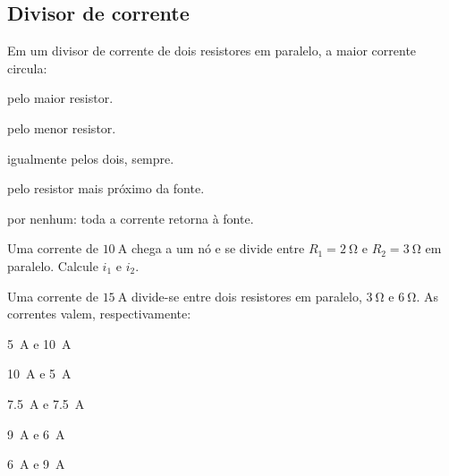 
\subsection{Divisor de corrente}

\blocofixacao
\begin{questao}[1]{}

Em um divisor de corrente de dois resistores em paralelo, a maior corrente
circula:
\begin{alternativas}
\item pelo maior resistor.
\item pelo menor resistor.
\item igualmente pelos dois, sempre.
\item pelo resistor mais próximo da fonte.
\item por nenhum: toda a corrente retorna à fonte.
\end{alternativas}


\end{questao}
\begin{questao}[1]{}

Uma corrente de $\SI{10}{\ampere}$ chega a um nó e se divide entre
$R_1=\SI{2}{\ohm}$ e $R_2=\SI{3}{\ohm}$ em paralelo. Calcule $i_1$ e $i_2$.




\end{questao}
\begin{questao}[1]{}

Uma corrente de $\SI{15}{\ampere}$ divide-se entre dois resistores em paralelo,
$\SI{3}{\ohm}$ e $\SI{6}{\ohm}$. As correntes valem, respectivamente:
\begin{alternativas}[2]
\item \SI{5}{\ampere} e \SI{10}{\ampere}
\item \SI{10}{\ampere} e \SI{5}{\ampere}
\item \SI{7.5}{\ampere} e \SI{7.5}{\ampere}
\item \SI{9}{\ampere} e \SI{6}{\ampere}
\item \SI{6}{\ampere} e \SI{9}{\ampere}
\end{alternativas}


\end{questao}

